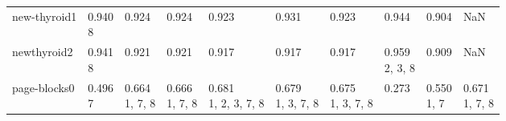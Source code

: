 \begin{tabular}{llllllllll}
new-thyroid1           &                 \makecell{0.940 \\ \scriptsize{8}} &         \makecell{0.924 \\ \scriptsize{}} &         \makecell{0.924 \\ \scriptsize{}} &               \makecell{0.923 \\ \scriptsize{}} &               \makecell{0.931 \\ \scriptsize{}} &               \makecell{0.923 \\ \scriptsize{}} &                     \makecell{0.944 \\ \scriptsize{}} &               \makecell{0.904 \\ \scriptsize{}} &                                       NaN \\
newthyroid2            &                 \makecell{0.941 \\ \scriptsize{8}} &         \makecell{0.921 \\ \scriptsize{}} &         \makecell{0.921 \\ \scriptsize{}} &               \makecell{0.917 \\ \scriptsize{}} &               \makecell{0.917 \\ \scriptsize{}} &               \makecell{0.917 \\ \scriptsize{}} &              \makecell{0.959 \\ \scriptsize{2, 3, 8}} &               \makecell{0.909 \\ \scriptsize{}} &                                       NaN \\
page-blocks0           &                 \makecell{0.496 \\ \scriptsize{7}} &  \makecell{0.664 \\ \scriptsize{1, 7, 8}} &  \makecell{0.666 \\ \scriptsize{1, 7, 8}} &  \makecell{0.681 \\ \scriptsize{1, 2, 3, 7, 8}} &     \makecell{0.679 \\ \scriptsize{1, 3, 7, 8}} &     \makecell{0.675 \\ \scriptsize{1, 3, 7, 8}} &                     \makecell{0.273 \\ \scriptsize{}} &           \makecell{0.550 \\ \scriptsize{1, 7}} &  \makecell{0.671 \\ \scriptsize{1, 7, 8}} \\

\end{tabular}
